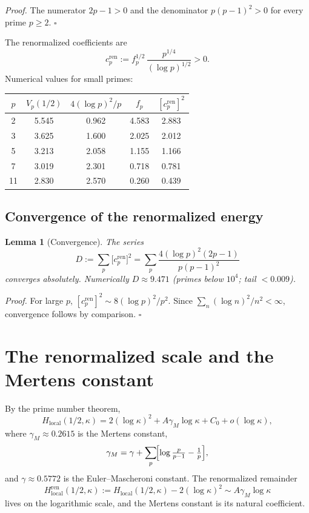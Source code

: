 \documentclass[11pt]{article}
\newtheorem*{lemma*}{Lemma}
\begin{document}
\textit{Proof.}
The numerator $2p-1>0$ and the denominator $p(p-1)^2>0$
for every prime $p\ge 2$. \hfill$\square$

The renormalized coefficients are
\begin{equation}\label{eq:cren}
c_p^{\mathrm{ren}}
:= f_p^{1/2}\,\frac{p^{1/4}}{(\log p)^{1/2}} > 0.
\end{equation}
Numerical values for small primes:

\begin{center}
\begin{tabular}{ccccc}
\toprule
$p$ & $V_p(1/2)$ & $4(\log p)^2/p$ & $f_p$
    & $[c_p^{\mathrm{ren}}]^2$ \\
\midrule
2  & 5.545 & 0.962 & 4.583 & 2.883 \\
3  & 3.625 & 1.600 & 2.025 & 2.012 \\
5  & 3.213 & 2.058 & 1.155 & 1.166 \\
7  & 3.019 & 2.301 & 0.718 & 0.781 \\
11 & 2.830 & 2.570 & 0.260 & 0.439 \\
\bottomrule
\end{tabular}
\end{center}

\subsection{Convergence of the renormalized energy}

\begin{lemma*}[Convergence]
The series
\begin{equation}\label{eq:D}
D := \sum_p \bigl[c_p^{\mathrm{ren}}\bigr]^2
   = \sum_p \frac{4(\log p)^2(2p-1)}{p(p-1)^2}
\end{equation}
converges absolutely. Numerically $D \approx 9.471$
(primes below $10^4$; tail $<0.009$).
\end{lemma*}

\textit{Proof.}
For large $p$, $[c_p^{\mathrm{ren}}]^2 \sim 8(\log p)^2/p^2$.
Since $\sum_n (\log n)^2/n^2 <\infty$, convergence follows
by comparison. \hfill$\square$

\section{The renormalized scale and the Mertens constant}

By the prime number theorem,
\[
H_{\mathrm{local}}(1/2,\kappa)
= 2(\log\kappa)^2 + A\gamma_M\log\kappa + C_0 + o(\log\kappa),
\]
where $\gamma_M \approx 0.2615$ is the Mertens constant,
\[
\gamma_M = \gamma + \sum_p\!\Bigl[\log\tfrac{p}{p-1}-\tfrac1p\Bigr],
\]
and $\gamma \approx 0.5772$ is the Euler--Mascheroni constant.
The renormalized remainder
\[
H_{\mathrm{local}}^{\mathrm{ren}}(1/2,\kappa)
:= H_{\mathrm{local}}(1/2,\kappa) - 2(\log\kappa)^2
\sim A\gamma_M\log\kappa
\]
lives on the logarithmic scale, and the Mertens constant
is its natural coefficient.
\end{document}
